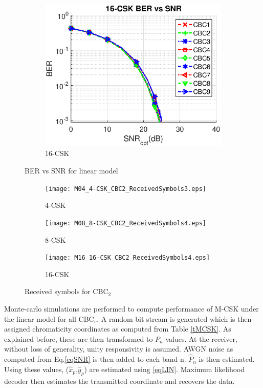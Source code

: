 \documentclass[10pt,letterpaper]{article}
\begin{document}
\begin{figure}[t]
		\hfill
		\begin{subfigure}{0.32\textwidth}
		\centering
			\includegraphics[trim={0.0in 0.0in 0.1in 0.3in}, clip=true, width=\textwidth]{M16_16-CSK_BERvsSNR.eps}
			\caption{16-CSK}
			\label{fig16SNR}
		\end{subfigure}
	\caption{BER vs SNR for linear model}
	\label{figBERvsSNR}
\end{figure}
\begin{figure}[b]
	\centering
		\begin{subfigure}{0.32\textwidth}
		\centering
			\texttt{[image: M04\_4-CSK\_CBC2\_ReceivedSymbols3.eps]}
			\caption{4-CSK}
			\label{fig4RcvSym}
		\end{subfigure}
		\begin{subfigure}{0.32\textwidth}
		\centering
			\texttt{[image: M08\_8-CSK\_CBC2\_ReceivedSymbols4.eps]}
			\caption{8-CSK}
			\label{fig8RcvSym}
		\end{subfigure}
		\begin{subfigure}{0.32\textwidth}
		\centering
			\texttt{[image: M16\_16-CSK\_CBC2\_ReceivedSymbols4.eps]}
			\caption{16-CSK}
			\label{fig16RcvSym}
		\end{subfigure}
	\caption{Received symbols for CBC$_{2}$}
	\label{figRcvSym}
\end{figure}

Monte-carlo simulations are performed to compute performance of M-CSK under the linear model for all CBC$_{v}$. A random bit stream is generated which is then assigned chromaticity coordinates as computed from Table \ref{tMCSK}. As explained before, these are then transformed to $P_{n}$ values. At the receiver, without loss of generality, unity responsivity is assumed. AWGN noise as computed from Eq.\eqref{eqSNR} is then added to each band n. $\hat{P}_{n}$ is then estimated. Using these values, ($\hat{x}_p$,$\hat{y}_p$) are estimated using \eqref{eqLIN}. Maximum likelihood decoder then estimates the transmitted coordinate and recovers the data.
\end{document}
